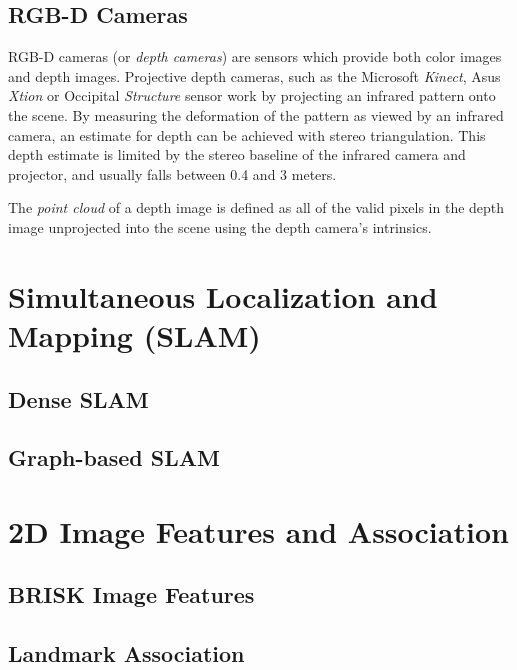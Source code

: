 \subsection{RGB-D Cameras}
\label{sec:rgbd} 
RGB-D cameras (or \textit{depth cameras}) are sensors which provide both color images and depth images. Projective depth cameras, such as the Microsoft \textit{Kinect}, Asus \textit{Xtion} or Occipital \textit{Structure} sensor work by projecting an infrared pattern onto the scene. By measuring the deformation of the pattern as viewed by an infrared camera, an estimate for depth can be achieved with stereo triangulation. This depth estimate is limited by the stereo baseline of the infrared camera and projector, and usually falls between 0.4 and 3 meters. 

The \textit{point cloud} of a depth image is defined as all of the valid pixels in the depth image unprojected into the scene using the depth camera's intrinsics.

\section{Simultaneous Localization and Mapping (SLAM)}
\label{sec:SLAM}
\subsection{Dense SLAM}
\label{sec:dense_slam}
\subsection{Graph-based SLAM}
\label{sec:graph_slam}

\section{2D Image Features and Association}
\label{sec:image_features}
\subsection{BRISK Image Features}
\subsection{Landmark Association}